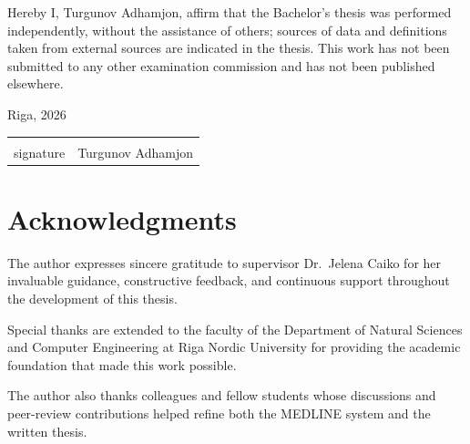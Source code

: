 \documentclass[12pt,a4paper,oneside]{report}
\begin{document}
Hereby I, Turgunov Adhamjon, affirm that the Bachelor's thesis was performed
independently, without the assistance of others; sources of data and definitions
taken from external sources are indicated in the thesis. This work has not been
submitted to any other examination commission and has not been published
elsewhere.

\vspace{1.5cm}
Riga, 2026

\vspace{2cm}
\noindent
\begin{tabular}{p{6cm}p{6cm}}
\hrulefill & \hrulefill\\
\centering signature & \centering Turgunov Adhamjon\\
\end{tabular}

\chapter*{Acknowledgments}

The author expresses sincere gratitude to supervisor Dr.\ Jelena Caiko for her
invaluable guidance, constructive feedback, and continuous support throughout
the development of this thesis.

Special thanks are extended to the faculty of the Department of Natural Sciences
and Computer Engineering at Riga Nordic University for providing the academic
foundation that made this work possible.

The author also thanks colleagues and fellow students whose discussions and
peer-review contributions helped refine both the MEDLINE system and the written
thesis.
\end{document}
